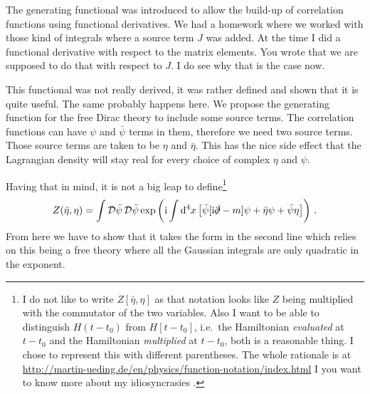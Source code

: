 \documentclass[11pt, english, fleqn, DIV=15, headinclude]{scrartcl}
\begin{document}
The generating functional was introduced to allow the build-up of correlation
functions using functional derivatives. We had a homework where we worked with
those kind of integrals where a source term $J$ was added. At the time I did a
functional derivative with respect to the matrix elements. You wrote that we
are supposed to do that with respect to $J$. I do see why that is the case now.

This functional was not really derived, it was rather defined and shown that it
is quite useful. The same probably happens here. We propose the generating
function for the free Dirac theory to include some source terms. The
correlation functions can have $\psi$ and $\bar\psi$ terms in them, therefore
we need two source terms. Those source terms are taken to be $\eta$ and
$\bar\eta$. This has the nice side effect that the Lagrangian density will stay
real for every choice of complex $\eta$ and $\psi$.

Having that in mind, it is not a big leap to define\footnote{%
    I do not like to write $Z[\bar\eta, \eta]$ as that notation looks like $Z$
    being multiplied with the commutator of the two variables. Also I want to
    be able to distinguish $H(t - t_0)$ from $H[t - t_0]$, i.e.\ the
    Hamiltonian \emph{evaluated} at $t - t_0$ and the Hamiltonian
    \emph{multiplied} at $t - t_0$, both is a reasonable thing. I chose to
    represent this with different parentheses. The whole rationale is at
    \url{http://martin-ueding.de/en/physics/function-notation/index.html} I you
    want to know more about my idiosyncrasies \Winkey.
}
\[
    Z(\bar\eta, \eta) = \int \mathcal D \bar\psi \, \mathcal D \bar\psi
    \exp\left( \mathrm i \int \mathop{}\!\mathrm d^4 x \left[ \bar\psi [\mathrm i \slashed\partial - m]
    \psi + \bar\eta \psi + \bar\psi \eta \right] \right) \,.
\]
From here we have to show that it takes the form in the second line which
relies on this being a free theory where all the Gaussian integrals are only
quadratic in the exponent.
\end{document}
